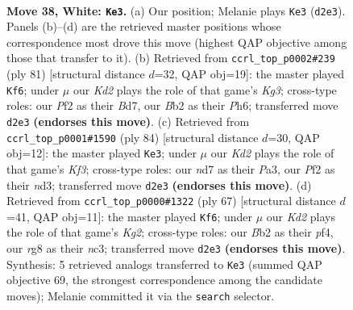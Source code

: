 \documentclass[11pt]{article}
\begin{document}
\clearpage

\begin{figure}[p]\centering
\begin{subfigure}{0.46\textwidth}\centering
\resizebox{\linewidth}{!}{%
\newchessgame
\chessboard[
  setfen={6r1/3n1k2/8/8/p1p1p3/P1P3Pp/1BPK1P1P/1R6 w - - 9 38},
  showmover=false,
  pgfstyle=straightmove, color=movearrow, markmove={d2-e3}
]}
\caption{}
\end{subfigure}\hfill
\begin{subfigure}{0.46\textwidth}\centering
\resizebox{\linewidth}{!}{%
\newchessgame
\chessboard[
  setfen={8/3b2p1/6kp/1p1Ppp2/p7/P4P1P/8/1R5K b - - 0 41},
  showmover=false,
  pgfstyle=straightmove, color=movearrow, markmove={g6-f6}
]}
\caption{}
\end{subfigure}
\\[4pt]
\begin{subfigure}{0.46\textwidth}\centering
\resizebox{\linewidth}{!}{%
\newchessgame
\chessboard[
  setfen={5kr1/3R4/1pp1p3/4P3/p1PB2Pp/P1Pn1K2/6P1/8 w - - 0 43},
  showmover=false,
  pgfstyle=straightmove, color=movearrow, markmove={f3-e3}
]}
\caption{}
\end{subfigure}\hfill
\begin{subfigure}{0.46\textwidth}\centering
\resizebox{\linewidth}{!}{%
\newchessgame
\chessboard[
  setfen={8/5pk1/1p4pp/p2p4/3P1P1P/P1N2b2/1P3P2/6K1 b - - 0 34},
  showmover=false,
  pgfstyle=straightmove, color=movearrow, markmove={g7-f6}
]}
\caption{}
\end{subfigure}
\caption{\textbf{Move 38, White: \texttt{Ke3}.} (a) Our position; Melanie plays \texttt{Ke3} (\texttt{d2e3}). Panels (b)--(d) are the retrieved master positions whose correspondence most drove this move (highest QAP objective among those that transfer to it). (b) Retrieved from \texttt{ccrl\_top\_p0002\#239} (ply 81) [structural distance $d$=32, QAP obj=19]: the master played \texttt{Kf6}; under $\mu$ our \emph{Kd2} plays the role of that game's \emph{Kg3}; cross-type roles: our \emph{P}f2 as their \emph{B}d7, our \emph{B}b2 as their \emph{P}h6; transferred move \texttt{d2e3} \textbf{(endorses this move)}. (c) Retrieved from \texttt{ccrl\_top\_p0001\#1590} (ply 84) [structural distance $d$=30, QAP obj=12]: the master played \texttt{Ke3}; under $\mu$ our \emph{Kd2} plays the role of that game's \emph{Kf3}; cross-type roles: our \emph{n}d7 as their \emph{P}a3, our \emph{P}f2 as their \emph{n}d3; transferred move \texttt{d2e3} \textbf{(endorses this move)}. (d) Retrieved from \texttt{ccrl\_top\_p0000\#1322} (ply 67) [structural distance $d$=41, QAP obj=11]: the master played \texttt{Kf6}; under $\mu$ our \emph{Kd2} plays the role of that game's \emph{Kg2}; cross-type roles: our \emph{B}b2 as their \emph{p}f4, our \emph{r}g8 as their \emph{n}c3; transferred move \texttt{d2e3} \textbf{(endorses this move)}. Synthesis: 5 retrieved analogs transferred to \texttt{Ke3} (summed QAP objective 69, the strongest correspondence among the candidate moves); Melanie committed it via the \texttt{search} selector.}
\label{fig:thought-m74}
\end{figure}
\end{document}
